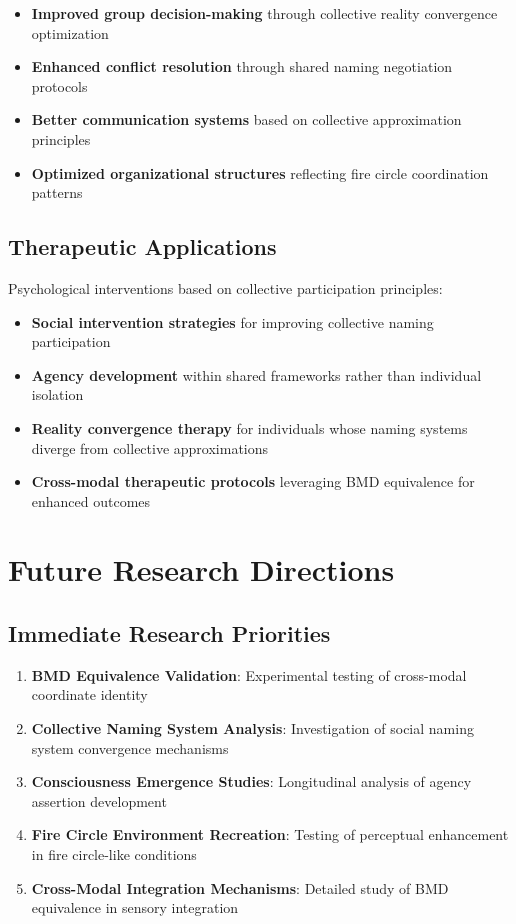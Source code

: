 \documentclass[12pt,a4paper]{article}
\begin{document}
\begin{itemize}
\item \textbf{Improved group decision-making} through collective reality convergence optimization
\item \textbf{Enhanced conflict resolution} through shared naming negotiation protocols
\item \textbf{Better communication systems} based on collective approximation principles
\item \textbf{Optimized organizational structures} reflecting fire circle coordination patterns
\end{itemize}

\subsection{Therapeutic Applications}

Psychological interventions based on collective participation principles:

\begin{itemize}
\item \textbf{Social intervention strategies} for improving collective naming participation
\item \textbf{Agency development} within shared frameworks rather than individual isolation
\item \textbf{Reality convergence therapy} for individuals whose naming systems diverge from collective approximations
\item \textbf{Cross-modal therapeutic protocols} leveraging BMD equivalence for enhanced outcomes
\end{itemize}

\section{Future Research Directions}

\subsection{Immediate Research Priorities}

\begin{enumerate}
\item \textbf{BMD Equivalence Validation}: Experimental testing of cross-modal coordinate identity
\item \textbf{Collective Naming System Analysis}: Investigation of social naming system convergence mechanisms
\item \textbf{Consciousness Emergence Studies}: Longitudinal analysis of agency assertion development
\item \textbf{Fire Circle Environment Recreation}: Testing of perceptual enhancement in fire circle-like conditions
\item \textbf{Cross-Modal Integration Mechanisms}: Detailed study of BMD equivalence in sensory integration
\end{enumerate}
\end{document}
